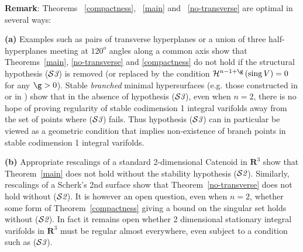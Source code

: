 \documentclass[a4paper,11pt]{amsart}
\begin{document}
\noindent
{\bf Remark}:  Theorems ~\ref{compactness}, ~\ref{main} and ~\ref{no-transverse} are optimal in several ways:

\noindent
{\bf(a)} Examples such as pairs of transverse hyperplanes or a union of three half-hyperplanes meeting at $120^{o}$ angles along a common axis show that  Theorems~\ref{main}, \ref{no-transverse} and \ref{compactness} do not hold  if the structural hypothesis (${\mathcal S{\emph 3}}$)  is removed (or replaced by  the condition ${\mathcal H}^{n-1+\g} \, ({\rm sing} \, V) = 0$ for any $\g >0$). Stable \emph{branched} minimal hypersurfaces (e.g. those constructed in \cite{SW1} or
in \cite{R}) show that in the absence of hypothesis (${\mathcal S{\emph 3}}$), even when $n=2$, there is no hope of proving regularity of stable codimension 1 integral varifolds away from the set of points where (${\mathcal S{\emph 3}}$) fails. Thus hypothesis (${\mathcal S}{\emph 3}$) can in particular be viewed as a geometric condition that implies non-existence of branch points in stable codimension 1 integral varifolds.

\noindent 
{\bf(b)} Appropriate rescalings of a standard 2-dimensional Catenoid  in ${\mathbf R}^{3}$ show that Theorem~\ref{main} does not hold without the stability hypothesis (${\mathcal S}{\emph 2}$). Similarly, rescalings of a Scherk's 2nd surface show that Theorem~\ref{no-transverse} does not hold without (${\mathcal S}{\emph 2}$). It is however an open question, even when $n=2$, 
whether some form of Theorem~\ref{compactness} giving a bound on the singular set holds without (${\mathcal S}{\emph 2}$). In fact it remains open whether  2 dimensional stationary integral varifolds in ${\mathbf R}^{3}$ must be regular almost everywhere, even subject to 
a condition such as (${\mathcal S}{\emph 3}$).
\end{document}
